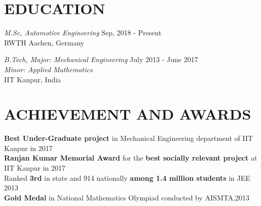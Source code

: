 \documentclass[margin, 10pt]{res} %
\begin{document}
\begin{resume}


\section{EDUCATION}

{\sl M.Sc, Automotive Engineering }%
\hfill Sep, 2018 - Present \\ 
RWTH Aachen, Germany

{\sl B.Tech, Major: Mechanical Engineering }%
  \hfill July 2013 - June 2017 \\ 
\phantom{x}\hspace{6.5ex} {\sl   Minor: Applied Mathematics}\\IIT Kanpur, India

 



 
 
\section{ACHIEVEMENT AND AWARDS} 


\textbf{Best Under-Graduate project} in Mechanical Engineering department of IIT Kanpur in 2017 \\
\textbf{Ranjan Kumar Memorial Award} for the \textbf{best socially relevant project} at IIT Kanpur in 2017\\
Ranked \textbf{3rd} in state and 914 nationally \textbf{among 1.4 million students} in JEE 2013\\
\textbf{Gold Medal} in National Mathematics Olympiad conducted by AISMTA,2013\\


\end{resume}
\end{document}
